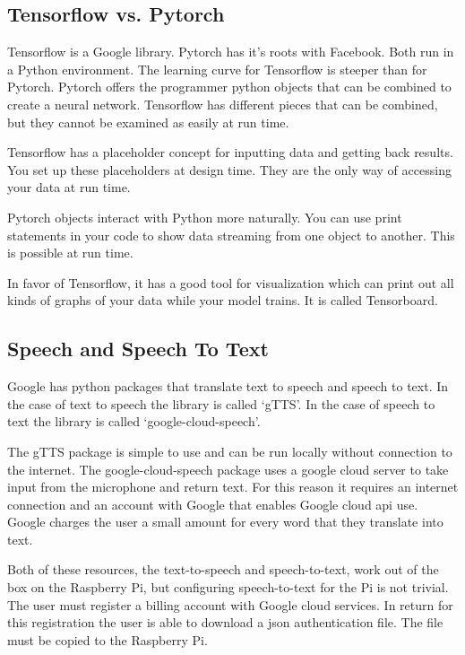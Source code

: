 \subsection{Tensorflow vs. Pytorch}

Tensorflow is a Google library. Pytorch has it's roots with Facebook. Both run in a Python environment. The learning curve for Tensorflow is steeper than for Pytorch. Pytorch offers the programmer python objects that can be combined to create a neural network. Tensorflow has different pieces that can be combined, but they cannot be examined as easily at run time.

Tensorflow has a placeholder concept for inputting data and getting back results. You set up these placeholders at design time. They are the only way of accessing your data at run time.

Pytorch objects interact with Python more naturally. You can use print statements in your code to show data streaming from one object to another. This is possible at run time.

In favor of Tensorflow, it has a good tool for visualization which can print out all kinds of graphs of your data while your model trains. It is called Tensorboard.

\subsection{Speech and Speech To Text}

Google has python packages that translate text to speech and speech to text. In the case of text to speech the library is called `gTTS'. In the case of speech to text the library is called `google-cloud-speech'. 

The gTTS package is simple to use and can be run locally without connection to the internet. The google-cloud-speech package uses a google cloud server to take input from the microphone and return text. For this reason it requires an internet connection and an account with Google that enables Google cloud api use. Google charges the user a small amount for every word that they translate into text. 

Both of these resources, the text-to-speech and speech-to-text, work out of the box on the Raspberry Pi, but configuring speech-to-text for the Pi is not trivial. The user must register a billing account with Google cloud services. In return for this registration the user is able to download a json authentication file. The file must be copied to the Raspberry Pi. 

